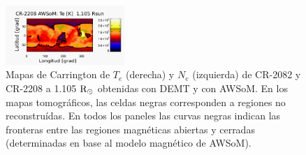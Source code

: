 \documentclass[baaa]{baaa}
\begin{document}
\begin{figure}[h!]
  \includegraphics[width=0.4\textwidth]{figuras/map_Te_awsom_2208_185_short_1105_Rsun_2.pdf}
  \caption{Mapas de Carrington de $T_e$ (derecha) y $N_e$ (izquierda) de CR-2082 y CR-2208 a 1.105 ${\rm R_\odot}$ obtenidas con DEMT y con AWSoM. En los mapas tomográficos, las celdas negras corresponden a regiones no reconstruídas. En todos los paneles las curvas negras indican las fronteras entre las regiones magnéticas abiertas y cerradas (determinadas en base al modelo magnético de AWSoM).}
  \label{fig-carrington}
\end{figure}
\end{document}
